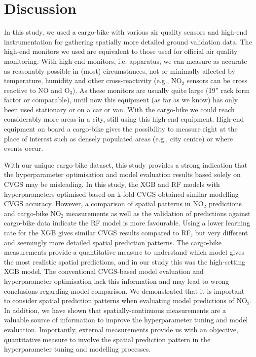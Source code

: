 \documentclass{article}
\begin{document}
    
 

 
\section{Discussion}
 
 
In this study, we used a cargo-bike with various air quality sensors and high-end instrumentation for gathering spatially more detailed ground validation data. The high-end monitors we used are equivalent to those used for official air quality monitoring. With high-end monitors, i.e. apparatus, we can measure as accurate as reasonably possible in (most) circumstances, not or minimally affected by temperature, humidity and other cross-reactivity (e.g., NO$_2$ sensors can be cross reactive to NO and O$_3$). As these monitors are usually quite large (19” rack form factor or comparable), until now this equipment (as far as we know) has only been used stationary or on a car or van. With the cargo-bike we could reach considerably more areas in a city, still using this high-end equipment. High-end equipment on board a cargo-bike gives the possibility to measure right at the place of interest such as densely populated areas (e.g., city centre) or where events occur.

With our unique cargo-bike dataset, this study provides a strong indication that the hyperparameter optimisation and model evaluation results based solely on CVGS may be misleading. In this study, the XGB and RF models with hyperparameters optimised based on k-fold CVGS obtained similar modelling CVGS accuracy. However, a comparison of spatial patterns in NO$_2$ predictions and cargo-bike NO$_2$ measurements as well as the validation of predictions against cargo-bike data indicate the RF model is more favourable. Using a lower learning rate for the XGB gives similar CVGS results compared to RF, but very different and seemingly more detailed spatial prediction patterns. The cargo-bike measurements provide a quantitative measure to understand which model gives the most realistic spatial predictions, and in our study this was the high-setting XGB model. The conventional CVGS-based model evaluation and hyperparameter optimisation lack this information and may lead to wrong conclusions regarding model comparison. We demonstrated that it is important to consider spatial prediction patterns when evaluating model predictions of NO$_2$. In addition, we have shown that spatially-continuous measurements are a valuable source of information to improve the hyperparameter tuning and model evaluation. Importantly, external measurements provide us with an objective, quantitative measure to involve the spatial prediction pattern in the hyperparameter tuning and modelling processes. 
\end{document}

